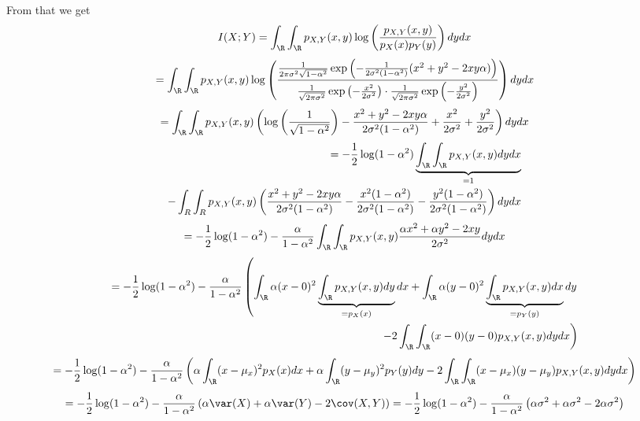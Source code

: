 \documentclass[english]{exercisesheet}
\begin{document}
\begin{solution}
\begin{equation*}
\end{equation*}
From that we get
\begin{equation*}
 I(X;Y)=\int_\R\int_\R p_{X,Y}(x,y)\log\left(\frac{p_{X,Y}(x,y)}{p_X(x)p_Y(y)}\right) dy dx
 \end{equation*}
 \begin{equation*}
 =\int_\R\int_\R p_{X,Y}(x,y)\log\left(\dfrac{\frac{1}{2\pi\sigma^2\sqrt{1-\alpha^2}}\exp\left(-\frac{1}{2\sigma^2(1-\alpha^2)}(x^2+y^2-2xy\alpha)\right)}{\frac{1}{\sqrt{2\pi\sigma^2}}\exp\left(-\frac{x^2}{2\sigma^2}\right)\cdot\frac{1}{\sqrt{2\pi\sigma^2}}\exp\left(-\frac{y^2}{2\sigma^2}\right)}\right)dydx
\end{equation*}
\begin{equation*}
 =\int_\R\int_\R p_{X,Y}(x,y)\left(\log\left(\frac{1}{\sqrt{1-\alpha^2}}\right)-\frac{x^2+y^2-2xy\alpha}{2\sigma^2(1-\alpha^2)}+\frac{x^2}{2\sigma^2}+\frac{y^2}{2\sigma^2}\right)dydx
\end{equation*}
\begin{align*}
 =-\frac{1}{2}\log(1-\alpha^2) \underbrace{\int_\R\int_\R p_{X,Y}(x,y)dydx}_{=1}\\
 -\int_R\int_R p_{X,Y}(x,y) \left(\frac{x^2+y^2-2xy\alpha}{2\sigma^2(1-\alpha^2)}-\frac{x^2(1-\alpha^2)}{2\sigma^2(1-\alpha^2)}-\frac{y^2(1-\alpha^2)}{2\sigma^2(1-\alpha^2)}\right)dydx
\end{align*}
\begin{equation*}
 =-\frac{1}{2}\log(1-\alpha^2)-\frac{\alpha}{1-\alpha^2}\int_\R\int_\R p_{X,Y}(x,y)\frac{\alpha x^2+\alpha y^2-2xy}{2\sigma^2}dydx
\end{equation*}
\begin{align*}
 =-\frac{1}{2}\log(1-\alpha^2)-\frac{\alpha}{1-\alpha^2}\left(\int_\R \alpha(x-0)^2\underbrace{\int_\R p_{X,Y}(x,y)dy}_{=p_X(x)}dx+\int_\R \alpha (y-0)^2\underbrace{\int_\R p_{X,Y}(x,y)dx}_{=p_Y(y)}dy\right.\\
 \left.-2\int_\R\int_\R (x-0)(y-0) p_{X,Y}(x,y) dydx\right)
\end{align*}
\begin{equation*}
 =-\frac{1}{2}\log(1-\alpha^2)-\frac{\alpha}{1-\alpha^2}\left(\alpha\int_\R (x-\mu_x)^2 p_X(x)dx+\alpha\int_\R (y-\mu_y)^2p_Y(y)dy-2\int_\R\int_\R (x-\mu_x)(y-\mu_y)p_{X,Y}(x,y)dydx\right)
\end{equation*}
\begin{equation*}
 =-\frac{1}{2}\log(1-\alpha^2)-\frac{\alpha}{1-\alpha^2}\left(\alpha\var(X)+\alpha\var(Y)-2\cov(X,Y)\right)=-\frac{1}{2}\log(1-\alpha^2)-\frac{\alpha}{1-\alpha^2}\left(\alpha\sigma^2+\alpha\sigma^2-2\alpha\sigma^2\right)

\end{equation*}
\end{solution}
\end{document}

